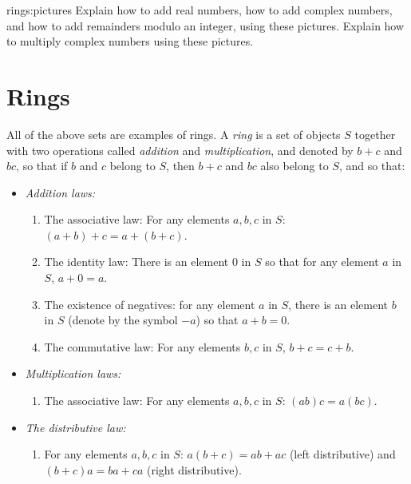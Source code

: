 \begin{problem}{rings:pictures}
Explain how to add real numbers, how to add complex numbers, and how to add remainders modulo an integer, using these pictures.
Explain how to multiply complex numbers using these pictures.
\end{problem}


\section{Rings}
All of the above sets are examples of rings.
A \emph{ring} is a set of objects \(S\) together with two operations called \emph{addition} and \emph{multiplication}, and denoted by \(b+c\) and \(bc\), so that if \(b\) and \(c\) belong to \(S\), then \(b+c\) and \(bc\) also belong to \(S\), and so that:
\smallskip
\begin{itemize}
\item[]\emph{Addition laws:}
\begin{enumerate}
\item The associative law: For any elements \(a, b, c\) in \(S\): \((a+b)+c=a+(b+c)\).
\item The identity law: There is an element \(0\) in \(S\) so that for any element \(a\) in \(S\), \(a+0=a\).
\item The existence of negatives: for any element \(a\) in \(S\), there is an element \(b\) in \(S\) (denote by the symbol \(-a\)) so that \(a+b=0\).
\item The commutative law: For any elements \(b, c\) in \(S\), \(b+c=c+b\).
\end{enumerate}
\smallskip
\item[]\emph{Multiplication laws:}
\begin{enumerate}
\item The associative law: For any elements \(a, b, c\) in \(S\): \((ab)c=a(bc)\).
\end{enumerate}
\smallskip
\item[]\emph{The distributive law:}
\begin{enumerate}
\item For any elements \(a, b, c\) in \(S\): \(a(b+c)=ab+ac\) (left distributive) and \((b+c)a=ba+ca\) (right distributive).
\end{enumerate}
\end{itemize}
\medskip

